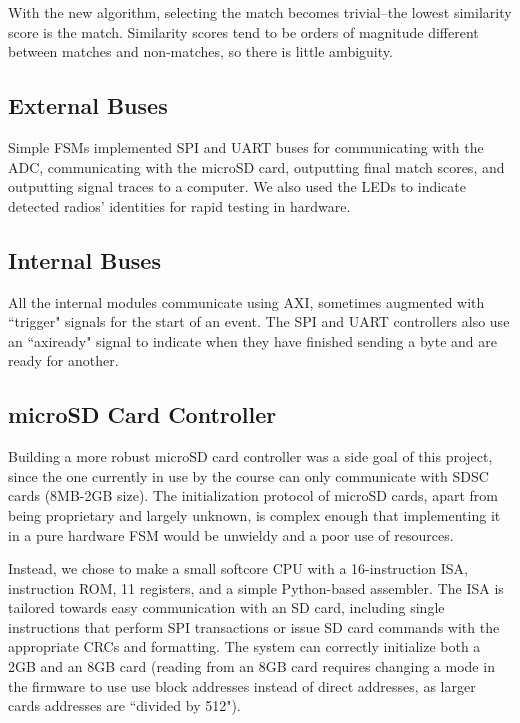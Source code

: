 \documentclass[conference]{IEEEtran}
\begin{document}
With the new algorithm, selecting the match becomes trivial--the lowest similarity score is the match. Similarity scores tend to be orders of magnitude different between matches and non-matches, so there is little ambiguity.

\subsection{External Buses}

Simple FSMs implemented SPI and UART buses for communicating with the ADC, communicating with the microSD card, outputting final match scores, and outputting signal traces to a computer. We also used the LEDs to indicate detected radios' identities for rapid testing in hardware.

\subsection{Internal Buses}

All the internal modules communicate using AXI, sometimes augmented with ``trigger" signals for the start of an event. The SPI and UART controllers also use an ``axiready" signal to indicate when they have finished sending a byte and are ready for another.

\subsection{microSD Card Controller}

Building a more robust microSD card controller was a side goal of this project, since the one currently in use by the course can only communicate with SDSC cards (8MB-2GB size). The initialization protocol of microSD cards, apart from being proprietary and largely unknown, is complex enough that implementing it in a pure hardware FSM would be unwieldy and a poor use of resources.

Instead, we chose to make a small softcore CPU with a 16-instruction ISA, instruction ROM, 11 registers, and a simple Python-based assembler. The ISA is tailored towards easy communication with an SD card, including single instructions that perform SPI transactions or issue SD card commands with the appropriate CRCs and formatting. The system can correctly initialize both a 2GB and an 8GB card (reading from an 8GB card requires changing a mode in the firmware to use use block addresses instead of direct addresses, as larger cards addresses are ``divided by 512").
\end{document}
